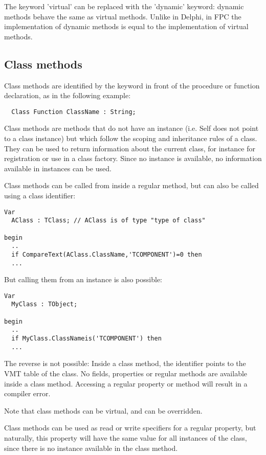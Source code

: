 \begin{remark}
The keyword 'virtual' can be replaced with the 'dynamic' keyword: dynamic
methods behave the same as virtual methods. Unlike in Delphi, in FPC the
implementation of dynamic methods is equal to the implementation of virtual
methods.
\end{remark}

\subsection{Class methods}
Class methods are identified by the keyword  in front of the
procedure or function declaration, as in the following example:
\begin{verbatim}
  Class Function ClassName : String;
\end{verbatim}
Class methods are methods that do not have an instance (i.e. Self does not
point to a class instance) but which follow the scoping and inheritance 
rules of a class. They can be used to return information about the current
class, for instance for registration or use in a class factory. Since no 
instance is available, no information available in instances can be used.

Class methods can be called from inside a regular method, but can also be called 
using a class identifier:
\begin{verbatim}
Var
  AClass : TClass; // AClass is of type "type of class"

begin
  ..
  if CompareText(AClass.ClassName,'TCOMPONENT')=0 then
  ...

\end{verbatim}
But calling them from an instance is also possible:
\begin{verbatim}
Var
  MyClass : TObject;

begin
  ..
  if MyClass.ClassNameis('TCOMPONENT') then
  ...
\end{verbatim}
The reverse is not possible: Inside a class method, the  identifier 
points to the VMT table of the class. No fields, properties or 
regular methods are available inside a class method. Accessing a regular 
property or method will result in a compiler error. 

Note that class methods can be virtual, and can be overridden.

Class methods can be used as read or write specifiers for a regular property, 
but naturally, this property will have the same value for all instances of the
class, since there is no instance available in the class method.

